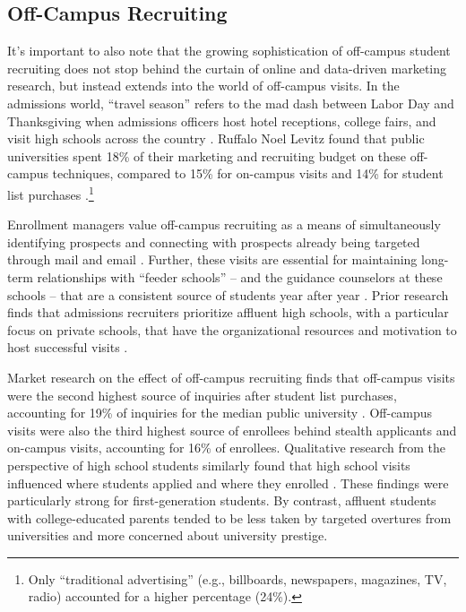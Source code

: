 \documentclass{article}
\begin{document}
\subsection*{Off-Campus Recruiting}

It's important to also note that the growing sophistication of off-campus student recruiting does not stop behind the curtain of online and data-driven marketing research, but instead extends into the world of off-campus visits. In the admissions world, ``travel season'' refers to the mad dash between Labor Day and Thanksgiving when admissions officers host hotel receptions, college fairs, and visit high schools across the country \citep{RN3519}. Ruffalo Noel Levitz found that public universities spent 18\% of their marketing and recruiting budget on these off-campus techniques, compared to 15\% for on-campus visits and 14\% for student list purchases \citep{RN4402}.\footnote{Only ``traditional advertising'' (e.g., billboards, newspapers, magazines, TV, radio) accounted for a higher percentage (24\%).}

Enrollment managers value off-campus recruiting as a means of simultaneously identifying prospects and connecting with prospects already being targeted through mail and email \citep{RN4323, RN4315, RN3519}. Further, these visits are essential for maintaining long-term relationships with ``feeder schools'' -- and the guidance counselors at these schools -- that are a consistent source of students year after year \citep{RN3519, RN4402}. Prior research finds that admissions recruiters prioritize affluent high schools, with a particular focus on private schools, that have the organizational resources and motivation to host successful visits \citep{RN3519}.

Market research on the effect of off-campus recruiting finds that off-campus visits were the second highest source of inquiries after student list purchases, accounting for 19\% of inquiries for the median public university \citep{RN4402}. Off-campus visits were also the third highest source of enrollees behind stealth applicants and on-campus visits, accounting for 16\% of enrollees.  Qualitative research from the perspective of high school students similarly found that high school visits influenced where students applied and where they enrolled \citep{RN4324}. These findings were particularly strong for first-generation students. By contrast, affluent students with college-educated parents tended to be less taken by targeted overtures from universities and more concerned about university prestige.
\end{document}
